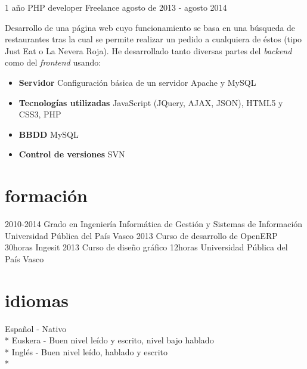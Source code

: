 \documentclass[]{friggeri-cv} %
\begin{document}
\begin{entrylist}
\entry
{1 año}
{PHP developer {\normalfont Freelance}}
{agosto de 2013 - agosto 2014}
{Desarrollo de una p\'agina web cuyo funcionamiento se basa en una b\'usqueda de restaurantes tras la cual se permite realizar un pedido a cualquiera de \'estos (tipo Just Eat o La Nevera Roja). He desarrollado tanto diversas partes del \textit{backend} como del \textit{frontend} usando:
\begin{itemize}
\item\textbf{Servidor} Configuraci\'on b\'asica de un servidor Apache y MySQL
\item\textbf{Tecnolog\'ias utilizadas} JavaScript (JQuery, AJAX, JSON), HTML5 y CSS3, PHP
\item\textbf{BBDD}	MySQL
\item\textbf{Control de versiones} SVN\\
\end{itemize}}
\end{entrylist}
\section{formaci\'on}
\begin{entrylist}
\entry
{2010-2014}
{Grado en Ingenier\'ia Inform\'atica {\normalfont de Gesti\'on y Sistemas de Informaci\'on}}
{}
{Universidad P\'ublica del Pa\'is Vasco}
\entry
{2013}
{Curso de desarrollo de OpenERP}
{30horas}
{Ingesit}
\entry
{2013}
{Curso de diseño gr\'afico}
{12horas}
{Universidad P\'ublica del Pa\'is Vasco}
\end{entrylist}

\section{idiomas}
\begin{entrylist}
Español - Nativo \\* 
Euskera -  Buen nivel le\'ido y escrito, nivel bajo hablado\\* 
Ingl\'es -  Buen nivel le\'ido, hablado y escrito\\* 
\end{entrylist}
\end{document}
